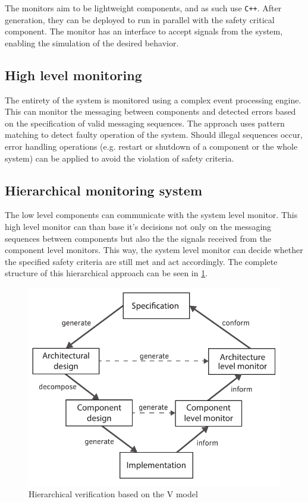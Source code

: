 The monitors aim to be lightweight components, and as such use \verb!C++!. After generation, they can be deployed to run in parallel with the safety critical component. The monitor has an interface to accept signals from the system, enabling the simulation of the desired behavior.

\subsection{High level monitoring}
The entirety of the system is monitored using a complex event processing engine. This can monitor the messaging between components and detected errors based on the specification of valid messaging sequences. The approach uses pattern matching to detect faulty operation of the system. Should illegal sequences occur, error handling operations (e.g. restart or shutdown of a component or the whole system) can be applied to avoid the violation of safety criteria.

\subsection{Hierarchical monitoring system}
The low level components can communicate with the system level monitor. This high level monitor can than base it's decisions not only on the messaging sequences between components but also the the signals received from the component level monitors. This way, the system level monitor can decide whether the specified safety criteria are still met and act accordingly. The complete structure of this hierarchical approach can be seen in \cref{fig:intro:rvmodel}.

\begin{figure}[h]
	\centering
	\includegraphics[width=0.8\linewidth]{include/figures/chapter_1/rv_vmodel}
	\caption{Hierarchical verification based on the V model}
	\label{fig:intro:rvmodel}
\end{figure}